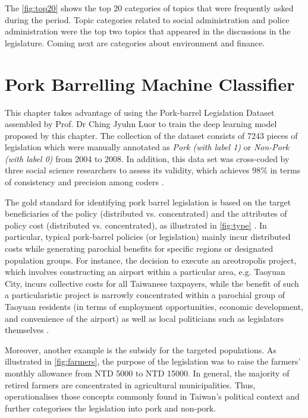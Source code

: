 The \autoref{fig:top20} shows the top 20 categories of topics that were frequently asked during the period. Topic categories related to social administration and police administration were the top two topics that appeared in the discussions in the legislature. Coming next are categories about environment and finance. 



\section*{\centering Pork Barrelling Machine Classifier}

This chapter takes advantage of using the Pork-barrel Legislation Dataset assembled by Prof. Dr Ching Jyuhn Luor \citep{Luor2008, Luor2009, Luor2012} to train the deep learning model proposed by this chapter. The collection of the dataset consists of 7243 pieces of legislation which were manually annotated as \textit{Pork (with label 1)} or \textit{Non-Pork (with label 0)} from 2004 to 2008. In addition, this data set was cross-coded by three social science researchers to assess its validity, which achieves 98\% in terms of consistency and precision among coders \citep{Luor2008,Luor2009}. 



The gold standard for identifying pork barrel legislation is based on the target beneficiaries of the policy (distributed vs. concentrated) and the attributes of policy cost (distributed vs. concentrated), as illustrated in \autoref{fig:type}  \citep{Wilson2001}. In particular, typical pork-barrel policies (or legislation) mainly incur distributed costs while generating parochial benefits for specific regions or designated population groups. For instance, the decision to execute an areotropolis project, which involves constructing an airport within a particular area, e.g. Taoyuan City, incurs collective costs for all Taiwanese taxpayers, while the benefit of such a particularistic project is narrowly concentrated within a parochial group of Taoyuan residents (in terms of employment opportunities, economic development, and convenience of the airport) as well as local politicians such as legislators themselves \citep{Luor2008, Luor2009, Luor2012}. 

Moreover, another example is the subsidy for the targeted populations. As illustrated in \autoref{fig:farmers}, the purpose of the legislation was to raise the farmers' monthly allowance from NTD 5000 to NTD 15000. In general, the majority of retired farmers are concentrated in agricultural municipalities. Thus, \citet{Luor2008, Luor2009} operationalises those concepts commonly found in Taiwan's political context and further categorises the legislation into pork and non-pork.

